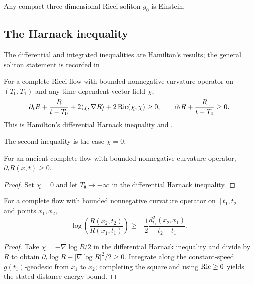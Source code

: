 \begin{theorem}
\label{thm:ricci-soliton-einstein-dimension-three}
\label{ivey}
Any compact three-dimensional Ricci soliton $g_0$ is Einstein.
\end{theorem}

\subsection{The Harnack inequality}
The differential and integrated inequalities are Hamilton's results; the
general soliton statement is recorded in \cite{Ivey}.
\begin{theorem}
\label{thm:hamilton-harnack-inequality}
\label{Harnack}
For a complete Ricci flow with bounded nonnegative curvature operator on
$(T_0,T_1)$ and any time-dependent vector field $\chi$,
\[
\partial_tR+\frac{R}{t-T_0}+2\langle\chi,\nabla R\rangle+2\operatorname{Ric}(\chi,\chi)\ge0,
\qquad \partial_tR+\frac{R}{t-T_0}\ge0.
\]
This is Hamilton's differential Harnack inequality \cite{Hamiltonharnack} and
\cite{Hamiltonharnack}.
\end{theorem}
\begin{remark}
\label{rem:harnack-inequality-zero-field-case}

The second inequality is the case $\chi=0$.
\end{remark}

\begin{corollary}
\label{cor:ancient-flow-scalar-curvature-nondecreasing}
\label{posderiv}
For an ancient complete flow with bounded nonnegative curvature operator,
$\partial_tR(x,t)\ge0$.
\end{corollary}
\begin{proof}
\sketch Set $\chi=0$ and let $T_0\to-\infty$ in the differential Harnack
inequality.
\end{proof}

\begin{theorem}
\label{thm:harnack-inequality-integrated}
\label{Harnack2}
For a complete flow with bounded nonnegative curvature operator on
$[t_1,t_2]$ and points $x_1,x_2$,
\[
\log\left(\frac{R(x_2,t_2)}{R(x_1,t_1)}\right)
\ge-\frac12\frac{d_{t_1}^2(x_2,x_1)}{t_2-t_1}.
\]
\end{theorem}
\begin{proof}
\sketch Take $\chi=-\nabla\log R/2$ in the differential Harnack inequality and
divide by $R$ to obtain
$\partial_t\log R-|\nabla\log R|^2/2\ge0$. Integrate along the constant-speed
$g(t_1)$-geodesic from $x_1$ to $x_2$; completing the square and using
$\operatorname{Ric}\ge0$ yields the stated distance-energy bound.
\end{proof}
